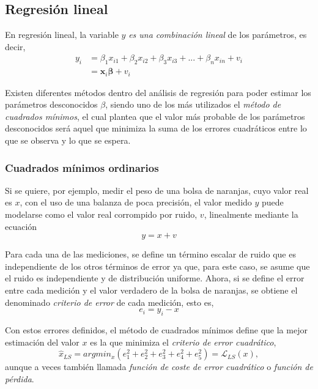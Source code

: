 
\subsection{Regresión lineal}
En regresión lineal, la variable $y$ \textit{es una combinación lineal} de los parámetros, es decir,
\begin{align}
    y_i &= \beta_1 x_{i1} + \beta_2 x_{i2} + \beta_3 x_{i3} + ... + \beta_n x_{in} + v_i \\
      &= \textbf{x}_i \bm{\beta} + v_i
\end{align}

Existen diferentes métodos dentro del análisis de regresión para poder estimar los parámetros desconocidos $\beta$, siendo uno de los más utilizados el \textit{método de cuadrados mínimos}, el cual plantea que el valor más probable de los parámetros desconocidos será aquel que minimiza la suma de los errores cuadráticos entre lo que se observa y lo que se espera.

\subsubsection{Cuadrados mínimos ordinarios}
Si se quiere, por ejemplo, medir el peso de una bolsa de naranjas, cuyo valor real es $x$, con el uso de una balanza de poca precisión, el valor medido $y$ puede modelarse como el valor real corrompido por ruido, $v$, linealmente mediante la ecuación
\begin{equation}
    y = x + v
    \label{eq:linearmeasmodel}
\end{equation}

Para cada una de las mediciones, se define un término escalar de ruido que es independiente de los otros términos de error ya que, para este caso, se asume que el ruido es independiente y de distribución uniforme. Ahora, si se define el error entre cada medición y el valor verdadero de la bolsa de naranjas, se obtiene el denominado \textit{criterio de error} de cada medición, esto es,
\begin{equation}
    e_i = y_i - x
\end{equation}

Con estos errores definidos, el método de cuadrados mínimos define que la mejor estimación del valor $x$ es la que minimiza el \textit{criterio de error cuadrático},
\begin{equation}
    \hat{x}_{LS} = argmin_x(e_1^2+e_2^2+e_3^2+e_4^2+e_5^2) = \mathscr{L}_{LS}(x),
\end{equation}
aunque a veces también llamada \textit{función de coste de error cuadrático} o \textit{función de pérdida}.

